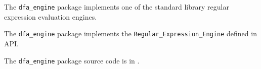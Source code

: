 
The {\tt dfa\_engine} package implements one of the 
standard library regular expression evaluation engines.

The {\tt dfa\_engine} package implements the {\tt Regular\_Expression\_Engine} defined in  API.

The {\tt dfa\_engine} package source code is in .



